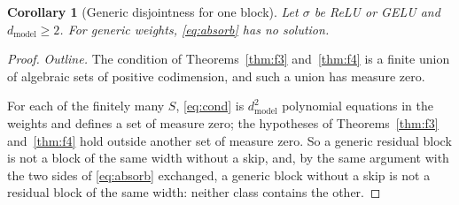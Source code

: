 \documentclass[10pt]{article}
\newtheorem{corollary}[theorem]{Corollary}
\theoremstyle{definition}
\theoremstyle{remark}
\newcommand{\dm}{d_{\mathrm{model}}}
\begin{document}
\begin{corollary}[Generic disjointness for one block]\label{cor:f5}
Let $\sigma$ be ReLU or GELU and $\dm \ge 2$. For generic weights, \eqref{eq:absorb} has no solution.
\end{corollary}
\begin{proof}
\emph{Outline.} The condition of Theorems~\ref{thm:f3} and~\ref{thm:f4} is a finite union of algebraic sets of positive codimension, and such a union has measure zero.

For each of the finitely many $S$, \eqref{eq:cond} is $\dm^2$ polynomial equations in the weights and defines a set of measure zero; the hypotheses of Theorems~\ref{thm:f3} and~\ref{thm:f4} hold outside another set of measure zero. So a generic residual block is not a block of the same width without a skip, and, by the same argument with the two sides of \eqref{eq:absorb} exchanged, a generic block without a skip is not a residual block of the same width: neither class contains the other.
\end{proof}
\end{document}
